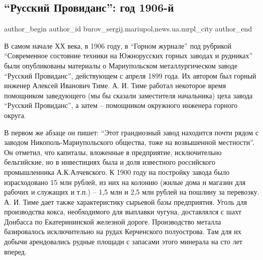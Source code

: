  
 
 
 
 
 
\subsection{\enquote{Русский Провиданс}: год 1906-й}
\label{sec:25_01_2017.stz.news.ua.mrpl_city.1.russkij_providans_god_1906}
 
\ifcmt
 author_begin
   author_id burov_sergij.mariupol,news.ua.mrpl_city
 author_end
\fi

В самом начале ХХ века, в 1906 году, в \enquote{Горном журнале} под рубрикой
\enquote{Современное  состояние техники на Южнорусских горных заводах и рудниках} были
опубликованы материалы о Мариупольском металлургическом заводе \enquote{Русский
Провиданс}, действующем с апреля 1899 года.  Их автором был горный инженер
Алексей Иванович Тиме. А. И. Тиме работал некоторое время помощником заведующего
(мы бы сказали заместителя начальника) цеха завода \enquote{Русский Провиданс}, а затем
– помощником окружного инженера горного округа.


В первом же абзаце он пишет: \enquote{Этот грандиозный завод находится почти рядом с
заводом Никополь-Мариупольского общества, тоже на возвышенной местности}. Он
отметил, что капиталы, вложенные в предприятие, исключительно бельгийские, но в
инвестициях была и доля известного российского промышленника А.К.Алчевского. К
1900 году на постройку завода было израсходовано 15 млн рублей, из них на
колонию (жилые дома и  магазин для рабочих и служащих и т.п.) – 1,5 млн и 2,5
млн рублей на пошлину за перевозку. А. И. Тиме дает также  характеристику
сырьевой базы предприятия. Уголь  для производства кокса, необходимого для
выплавки чугуна, доставлялся с шахт Донбасса по Екатерининской железной дороге.
Производство металла базировалось исключительно на рудах Керченского
полуострова. Там для их добычи арендовались рудные площади с запасами этого
минерала на сто лет вперед.


